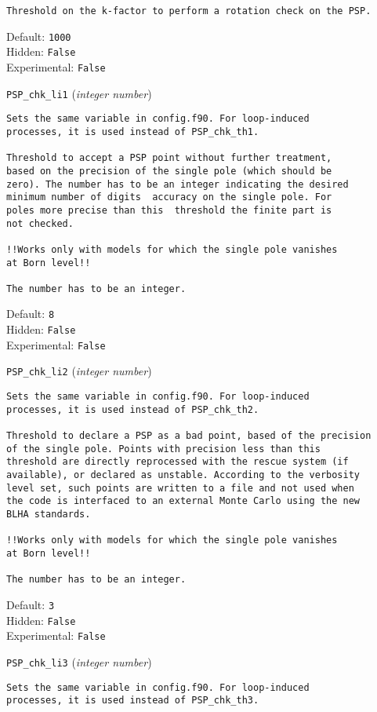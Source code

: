 \begin{basedescript}{\desclabelstyle{\pushlabel}}
\begin{verbatim}
Threshold on the k-factor to perform a rotation check on the PSP.
\end{verbatim}
Default: \verb|1000|
\\Hidden: \verb|False|
\\Experimental: \verb|False|
\\\item[\colorbox{gray!30}{\texttt{PSP\_chk\_li1}}] (\textit{integer number})
\begin{verbatim}
Sets the same variable in config.f90. For loop-induced
processes, it is used instead of PSP_chk_th1.

Threshold to accept a PSP point without further treatment,
based on the precision of the single pole (which should be
zero). The number has to be an integer indicating the desired
minimum number of digits  accuracy on the single pole. For
poles more precise than this  threshold the finite part is
not checked.

!!Works only with models for which the single pole vanishes
at Born level!!

The number has to be an integer.
\end{verbatim}
Default: \verb|8|
\\Hidden: \verb|False|
\\Experimental: \verb|False|
\\\item[\colorbox{gray!30}{\texttt{PSP\_chk\_li2}}] (\textit{integer number})
\begin{verbatim}
Sets the same variable in config.f90. For loop-induced
processes, it is used instead of PSP_chk_th2.

Threshold to declare a PSP as a bad point, based of the precision
of the single pole. Points with precision less than this
threshold are directly reprocessed with the rescue system (if
available), or declared as unstable. According to the verbosity
level set, such points are written to a file and not used when
the code is interfaced to an external Monte Carlo using the new
BLHA standards.

!!Works only with models for which the single pole vanishes
at Born level!!

The number has to be an integer.
\end{verbatim}
Default: \verb|3|
\\Hidden: \verb|False|
\\Experimental: \verb|False|
\\\item[\colorbox{gray!30}{\texttt{PSP\_chk\_li3}}] (\textit{integer number})
\begin{verbatim}
Sets the same variable in config.f90. For loop-induced
processes, it is used instead of PSP_chk_th3.


\end{verbatim}
\end{basedescript}
